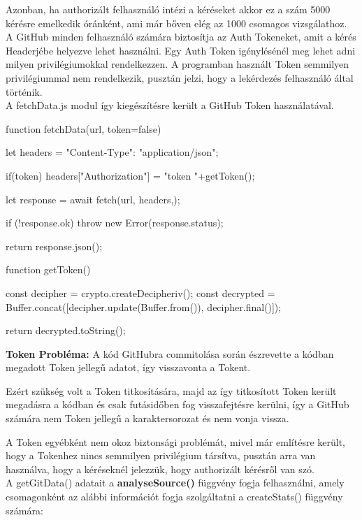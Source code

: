 Azonban, ha authorizált felhasználó intézi a kéréseket akkor ez a szám 5000 kérésre emelkedik óránként, ami már bőven elég az 1000 csomagos vizsgálathoz.\\

A GitHub minden felhasználó számára biztosítja az Auth Tokeneket, amit a kérés Headerjébe helyezve lehet használni. Egy Auth Token igénylésénél meg lehet adni milyen privilégiumokkal rendelkezzen. A programban használt Token semmilyen privilégiummal nem rendelkezik, pusztán jelzi, hogy a lekérdezés felhasználó által történik.\\

A fetchData.js modul így kiegészítésre került a GitHub Token használatával.

\pagebreak

\begin{cpp}
function fetchData(url, token=false){
	let headers = {"Content-Type": "application/json"};
	
	if(token){
		headers["Authorization"] = "token "+getToken();
	}
	
	let response = await fetch(url, {headers,});
	
	if (!response.ok) {
		throw new Error(response.status);
	}
	
	return response.json();
}

function getToken(){
	const decipher = crypto.createDecipheriv();
	const decrypted = Buffer.concat([decipher.update(Buffer.from()),
						decipher.final()]);
	
	return decrypted.toString();
}
\end{cpp}
\textbf{Token Probléma:} A kód GitHubra commitolása során észrevette a kódban megadott Token jellegű adatot, így visszavonta a Tokent. 

Ezért szükség volt a Token titkosítására, majd az így titkosított Token került megadásra a kódban és csak futásidőben fog visszafejtésre kerülni, így a GitHub számára nem Token jellegű a karaktersorozat és nem vonja vissza.

A Token egyébként nem okoz biztonsági problémát, mivel már említésre került, hogy a Tokenhez nincs semmilyen privilégium társítva, pusztán arra van használva, hogy a kéréseknél jelezzük, hogy authorizált kérésről van szó.\\

A getGitData() adatait a \textbf{analyseSource()} függvény fogja felhasználni, amely csomagonként az alábbi információt fogja szolgáltatni a createStats() függvény számára:

